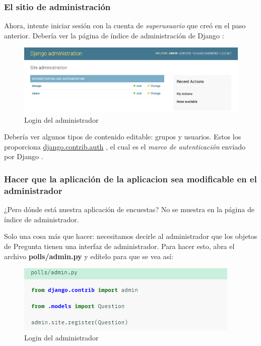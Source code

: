 \documentclass[10pt]{article}
\newcommand{\django}[1]{{\textcolor{G}{Django} #1}}
\begin{document}
\subsubsection*{El sitio de administración}

Ahora, intente iniciar sesión con la cuenta de \textit{superusuario} que creó en el paso anterior. Debería ver la página de índice de administración de \django{}:

\begin{figure}[H]
\begin{center}
\includegraphics[scale=0.9]{figuras/325/img2.png}
\caption{Login del administrador}
\end{center}
\end{figure}


Debería ver algunos tipos de contenido editable: grupos y usuarios. Estos los proporciona {\href{https://docs.djangoproject.com/en/3.0/topics/auth/#module-django.contrib.auth}{\textcolor{B}{django.contrib.auth}}}
, el cual es el \textit{marco de autenticación} enviado por \django{}.

\subsubsection*{Hacer que la aplicación de la aplicacion sea modificable en el administrador}

¿Pero dónde está nuestra aplicación de encuestas? No se muestra en la página de índice de administrador.

Solo una cosa más que hacer: necesitamos decirle al administrador que los objetos de Pregunta tienen una interfaz de administrador. Para hacer esto, abra el archivo \textbf{polls/admin.py} y edítelo para que se vea así:

\begin{figure}[H]
\begin{center}
\includegraphics[scale=0.9]{figuras/325/img3.png}
\caption{Login del administrador}
\end{center}
\end{figure}
\end{document}
